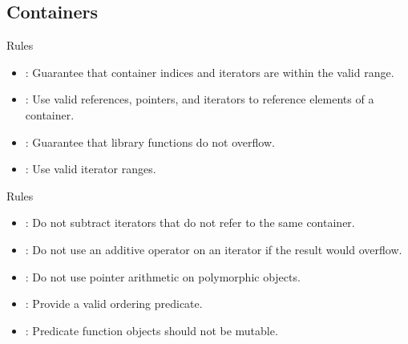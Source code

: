 \subsection{Containers}

\begin{frame}[t]{Rules}
\begin{itemize}
  \item {}: 
        Guarantee that container indices and iterators are within the valid range.
  \vfill
  \item {}: 
        Use valid references, pointers, and iterators to reference elements of a container.
  \vfill
  \item {}:
        Guarantee that library functions do not overflow. 
  \vfill
  \item {}: 
        Use valid iterator ranges.
\end{itemize}
\end{frame}

\begin{frame}[t]{Rules}
\begin{itemize}
  \item {}: 
        Do not subtract iterators that do not refer to the same container.
  \vfill
  \item {}:
        Do not use an additive operator on an iterator if the result would overflow. 
  \vfill
  \item {}: 
        Do not use pointer arithmetic on polymorphic objects.
  \vfill
  \item {}: 
        Provide a valid ordering predicate.
  \vfill
  \item {}: 
        Predicate function objects should not be mutable.
\end{itemize}
\end{frame}
